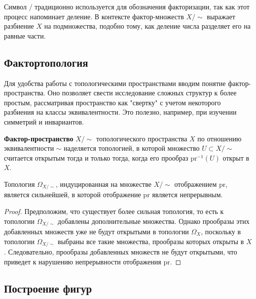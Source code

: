 \begin{remark}[об обозначачение]
Символ \( / \) традиционно используется для обозначения факторизации, так как этот процесс напоминает деление. В контексте фактор-множеств \( X / \sim \) выражает разбиение \( X \) на подмножества, подобно тому, как деление числа разделяет его на равные части. 
\end{remark}


\subsection{Фактортопология}


Для удобства работы с топологическими пространствами вводим понятие фактор-пространства. Оно позволяет свести исследование сложных структур к более простым, рассматривая пространство как "свертку" с учетом некоторого разбиения на классы эквивалентности. Это полезно, например, при изучении симметрий и инвариантов.

\begin{definition}
\textbf{Фактор-пространство} \( X/{\sim} \) топологического пространства \( X \) по отношению эквивалентности \( \sim \) наделяется топологией, в которой множество \( U \subset X/{\sim} \) считается открытым тогда и только тогда, когда его прообраз \( \text{pr}^{-1}(U) \) открыт в \( X \).
\end{definition}

\begin{statement}
	Топология \( \Omega_{X/{\sim}} \), индуцированная на множестве \( X/{\sim} \) отображением \( \mathrm{pr} \), является сильнейшей, в которой отображение \( \mathrm{pr} \) является непрерывным.
\end{statement}
	
\begin{proof}
Предположим, что существует более сильная топология, то есть к топологии \( \Omega_{X/{\sim}} \) добавлены дополнительные множества. Однако прообразы этих добавленных множеств уже не будут открытыми в топологии \( \Omega_X \), поскольку в топологии \( \Omega_{X/{\sim}} \) выбраны все такие множества, прообразы которых открыты в \( X \). Следовательно, прообразы добавленных множеств не будут открытыми, что приведет к нарушению непрерывности отображения \( \mathrm{pr} \).
\end{proof}
	
	

\subsection{Построение фигур}

